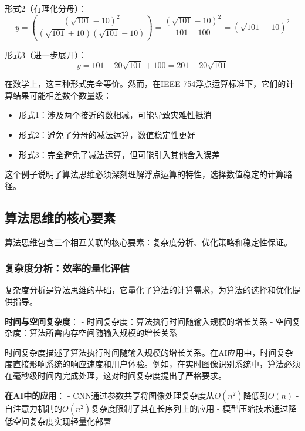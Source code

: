 形式2（有理化分母）：
$$y = \left(\frac{(\sqrt{101} - 10)^2}{(\sqrt{101} + 10)(\sqrt{101} - 10)}\right) = \frac{(\sqrt{101} - 10)^2}{101 - 100} = (\sqrt{101} - 10)^2$$

形式3（进一步展开）：
$$y = 101 - 20\sqrt{101} + 100 = 201 - 20\sqrt{101}$$

在数学上，这三种形式完全等价。然而，在IEEE 754浮点运算标准下，它们的计算结果可能相差数个数量级：

\begin{itemize}
\item 形式1：涉及两个接近的数相减，可能导致灾难性抵消
\item 形式2：避免了分母的减法运算，数值稳定性更好
\item 形式3：完全避免了减法运算，但可能引入其他舍入误差
\end{itemize}

这个例子说明了算法思维必须深刻理解浮点运算的特性，选择数值稳定的计算路径。

\subsection{算法思维的核心要素}

算法思维包含三个相互关联的核心要素：复杂度分析、优化策略和稳定性保证。

\subsubsection{复杂度分析：效率的量化评估}

复杂度分析是算法思维的基础，它量化了算法的计算需求，为算法的选择和优化提供指导。
  
\textbf{时间与空间复杂度}：
- 时间复杂度：算法执行时间随输入规模的增长关系
- 空间复杂度：算法所需内存空间随输入规模的增长关系
  
时间复杂度描述了算法执行时间随输入规模的增长关系。在AI应用中，时间复杂度直接影响系统的响应速度和用户体验。例如，在实时图像识别系统中，算法必须在毫秒级时间内完成处理，这对时间复杂度提出了严格要求。

  \textbf{在AI中的应用}：
  - CNN通过参数共享将图像处理复杂度从$O(n^2)$降低到$O(n)$
  - 自注意力机制的$O(n^2)$复杂度限制了其在长序列上的应用
  - 模型压缩技术通过降低空间复杂度实现轻量化部署
  
